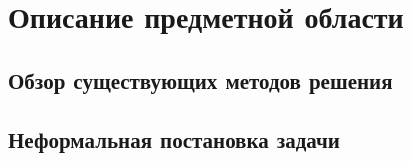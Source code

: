 \documentclass[../document.tex]{subfiles}
\begin{document}
	\section{Описание предметной области}
		\subsection{Обзор существующих методов решения}
		\subsection{Неформальная постановка задачи}
\end{document}
